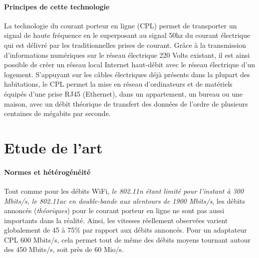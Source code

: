             \paragraph{Principes de cette technologie}
La technologie du courant porteur en ligne (CPL) permet de transporter un signal de haute fréquence en le superposant au signal 50hz du courant électrique qui est délivré par les traditionnelles prises de courant.
Grâce à la transmission d'informations numériques sur le réseau électrique 220 Volts existant, il est ainsi possible de créer un réseau local Internet haut-débit avec le réseau électrique d'un logement.
S'appuyant sur les câbles électriques déjà présents dans la plupart des habitations, le CPL permet la mise en réseau d'ordinateurs et de matériels équipés d'une prise RJ45 (Ethernet), dans un appartement, un bureau ou une maison, avec un débit théorique de transfert des données de l'ordre de plusieurs centaines de mégabits par seconde.
    \section{Etude de l’art}
            \paragraph{Normes et hétérogénéité}
Tout comme pour les débits WiFi, \emph{ le \emph{802.11n} étant limité pour l'instant à 300 Mbits/s, le \emph{802.11ac} en double-bande aux alentours de 1900 Mbits/s}, les débits annoncés (\emph{théoriques}) pour le courant porteur en ligne ne sont pas aussi importants dans la réalité.
Ainsi, les vitesses réellement observées varient globalement de 45 à 75\% par rapport aux débits annoncés.
Pour un adaptateur CPL 600 Mbits/s, cela permet tout de même des débits moyens tournant autour des 450 Mbits/s, soit près de 60 Mio/s.

